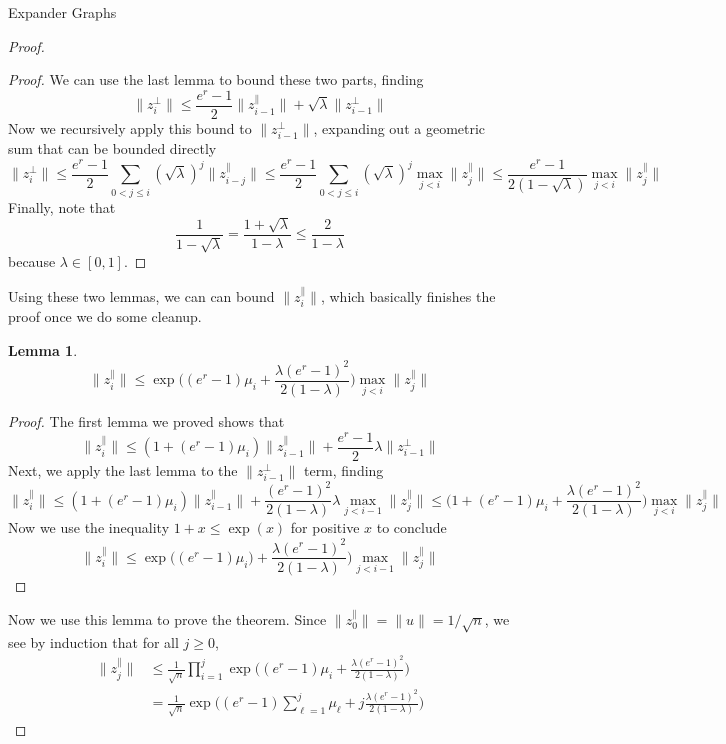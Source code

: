 \documentclass{article}
\newtheorem{lemma}{Lemma}
\begin{document}
\begin{section}{Expander Graphs}
\begin{proof}
\begin{proof}
      We can use the last lemma to bound these two parts, finding
      $$
      \lVert z_i^\perp\rVert \leq \frac{e^r - 1}{2}\lVert z_{i-1}^\parallel \rVert + \sqrt{\lambda}\lVert z_{i-1}^\perp \rVert
      $$
      Now we recursively apply this bound to $\lVert z_{i-1}^\perp \rVert$, expanding out a geometric sum that can be bounded directly
      $$
      \lVert z_i^\perp\rVert \leq \frac{e^r-1}{2}\sum_{0 < j \leq i}(\sqrt{\lambda})^j\lVert z_{i-j}^\parallel \rVert \leq \frac{e^r-1}{2}\sum_{0 < j \leq i}(\sqrt{\lambda})^j\max_{j < i}\lVert z_j^\parallel \rVert \leq \frac{e^r-1}{2(1-\sqrt \lambda)}\max_{j < i}\lVert z_j^\parallel \rVert
      $$
      Finally, note that
      $$
      \frac{1}{1-\sqrt \lambda} = \frac{1+\sqrt \lambda}{1-\lambda} \leq \frac{2}{1-\lambda}
      $$
      because $\lambda \in [0,1]$.
    \end{proof}
    Using these two lemmas, we can can bound $\lVert z_i^\parallel \rVert$, which basically finishes the proof once we do some cleanup.
    \begin{lemma}
      $$\lVert z_i^\parallel\rVert \leq \exp\bigg((e^r-1)\mu_i + \frac{\lambda(e^r-1)^2}{2(1-\lambda)}\bigg)\max_{j < i}\lVert z_j^\parallel\rVert$$
    \end{lemma}
    \begin{proof}
      The first lemma we proved shows that
      $$
      \lVert z_i^\parallel \rVert \leq (1+(e^r-1)\mu_i)\lVert z_{i-1}^\parallel \rVert + \frac{e^r-1}{2}\lambda\lVert z_{i-1}^\perp \rVert
      $$
      Next, we apply the last lemma to the $\lVert z_{i-1}^\perp \rVert$ term, finding
      $$
      \lVert z_i^\parallel \rVert \leq (1+(e^r-1)\mu_i)\lVert z_{i-1}^\parallel \rVert + \frac{(e^r-1)^2}{2(1-\lambda)}\lambda \max_{j < i-1}\lVert z_j^\parallel\rVert \leq \bigg(1+(e^r-1)\mu_i + \frac{\lambda(e^r-1)^2}{2(1-\lambda)}\bigg) \max_{j < i}\lVert z_j^\parallel \rVert
      $$
      Now we use the inequality $1+x \leq \exp(x)$ for positive $x$ to conclude
      $$
      \lVert z_i^\parallel \rVert \leq \exp\bigg((e^r-1)\mu_i) + \frac{\lambda(e^r-1)^2}{2(1-\lambda)}\bigg) \max_{j < i-1}\lVert z_j^\parallel\rVert
      $$
    \end{proof}
    Now we use this lemma to prove the theorem.
    Since $\lVert z_0^\parallel \rVert = \lVert u \rVert = 1/\sqrt n$, we see by induction that for all $j \geq 0$,
    \begin{equation}
      \begin{aligned}
	\lVert z_j^\parallel \rVert &\leq \frac{1}{\sqrt n}\prod_{i=1}^j\exp\bigg((e^r-1)\mu_i + \frac{\lambda(e^r-1)^2}{2(1-\lambda)}\bigg)\\
	~&= \frac{1}{\sqrt n} \exp\bigg((e^r-1)\sum_{\ell = 1}^j \mu_\ell + j\frac{\lambda(e^r-1)^2}{2(1-\lambda)}\bigg)
      \end{aligned}
    \end{equation}


\end{proof}
\end{section}
\end{document}
